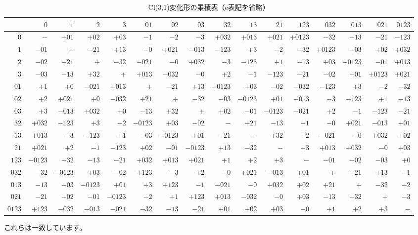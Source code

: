 \documentclass[a4paper,12pt,notitlepage]{jsreport}
\begin{document}
\begin{table}[ht]
  \begin{center}
    \caption{Cl(3,1)変化形の乗積表（e表記を省略）}
    \scriptsize
    \begin{tabular}{r|rrrrrrrrrrrrrrr}
      &$0$&$1$&$2$&$3$&$01$&$02$&$03$&$32$&$13$&$21$&$123$&$032$&$013$&$021$&$0123$\\\hline
      $0$&$-$&$+01$&$+02$&$+03$&$-1$&$-2$&$-3$&$+032$&$+013$&$+021$&$+0123$&$-32$&$-13$&$-21$&$-123$\\
      $1$&$-01$&$+$&$-21$&$+13$&$-0$&$+021$&$-013$&$-123$&$+3$&$-2$&$-32$&$+0123$&$-03$&$+02$&$+032$\\
      $2$&$-02$&$+21$&$+$&$-32$&$-021$&$-0$&$+032$&$-3$&$-123$&$+1$&$-13$&$+03$&$+0123$&$-01$&$+013$\\
      $3$&$-03$&$-13$&$+32$&$+$&$+013$&$-032$&$-0$&$+2$&$-1$&$-123$&$-21$&$-02$&$+01$&$+0123$&$+021$\\
      $01$&$+1$&$+0$&$-021$&$+013$&$+$&$-21$&$+13$&$-0123$&$+03$&$-02$&$-032$&$-123$&$+3$&$-2$&$-32$\\
      $02$&$+2$&$+021$&$+0$&$-032$&$+21$&$+$&$-32$&$-03$&$-0123$&$+01$&$-013$&$-3$&$-123$&$+1$&$-13$\\
      $03$&$+3$&$-013$&$+032$&$+0$&$-13$&$+32$&$+$&$+02$&$-01$&$-0123$&$-021$&$+2$&$-1$&$-123$&$-21$\\
      $32$&$+032$&$-123$&$+3$&$-2$&$-0123$&$+03$&$-02$&$-$&$+21$&$-13$&$+1$&$-0$&$+021$&$-013$&$+01$\\
      $13$&$+013$&$-3$&$-123$&$+1$&$-03$&$-0123$&$+01$&$-21$&$-$&$+32$&$+2$&$-021$&$-0$&$+032$&$+02$\\
      $21$&$+021$&$+2$&$-1$&$-123$&$+02$&$-01$&$-0123$&$+13$&$-32$&$-$&$+3$&$+013$&$-032$&$-0$&$+03$\\
      $123$&$-0123$&$-32$&$-13$&$-21$&$+032$&$+013$&$+021$&$+1$&$+2$&$+3$&$-$&$-01$&$-02$&$-03$&$+0$\\
      $032$&$-32$&$-0123$&$+03$&$-02$&$+123$&$-3$&$+2$&$-0$&$+021$&$-013$&$+01$&$+$&$-21$&$+13$&$-1$\\
      $013$&$-13$&$-03$&$-0123$&$+01$&$+3$&$+123$&$-1$&$-021$&$-0$&$+032$&$+02$&$+21$&$+$&$-32$&$-2$\\
      $021$&$-21$&$+02$&$-01$&$-0123$&$-2$&$+1$&$+123$&$+013$&$-032$&$-0$&$+03$&$-13$&$+32$&$+$&$-3$\\
      $0123$&$+123$&$-032$&$-013$&$-021$&$-32$&$-13$&$-21$&$+01$&$+02$&$+03$&$-0$&$+1$&$+2$&$+3$&$-$\\
    \end{tabular}
  \end{center}
\end{table}
これらは一致しています。
\end{document}
